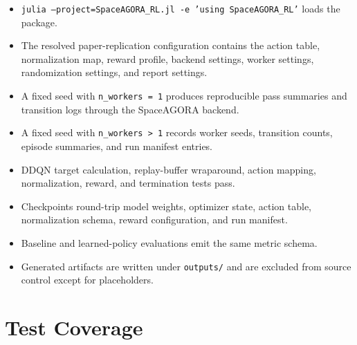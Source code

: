 \documentclass[11pt]{article}
\begin{document}
\begin{itemize}
\item \texttt{julia --project=SpaceAGORA\_RL.jl -e 'using SpaceAGORA\_RL'} loads the package.
\item The resolved paper-replication configuration contains the action table, normalization map, reward profile, backend settings, worker settings, randomization settings, and report settings.
\item A fixed seed with \texttt{n\_workers = 1} produces reproducible pass summaries and transition logs through the SpaceAGORA backend.
\item A fixed seed with \texttt{n\_workers > 1} records worker seeds, transition counts, episode summaries, and run manifest entries.
\item DDQN target calculation, replay-buffer wraparound, action mapping, normalization, reward, and termination tests pass.
\item Checkpoints round-trip model weights, optimizer state, action table, normalization schema, reward configuration, and run manifest.
\item Baseline and learned-policy evaluations emit the same metric schema.
\item Generated artifacts are written under \texttt{outputs/} and are excluded from source control except for placeholders.
\end{itemize}

\section{Test Coverage}
\end{document}
